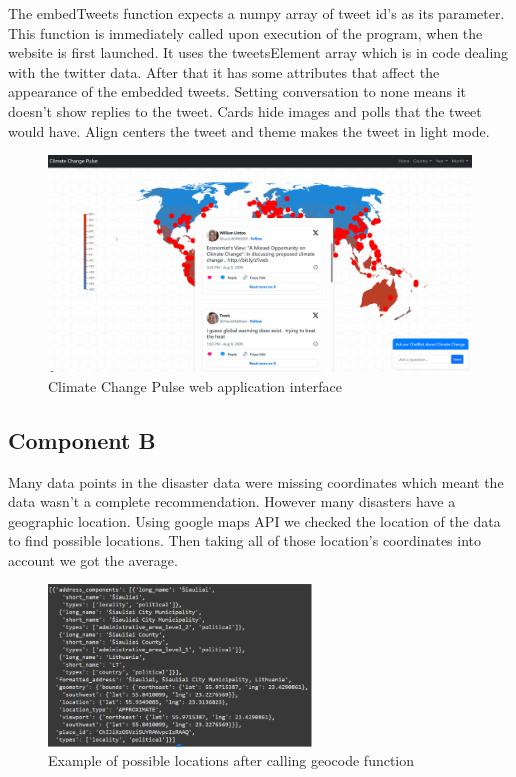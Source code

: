 \documentclass[pdflatex,sn-mathphys-num]{sn-jnl}%
\theoremstyle{thmstyleone}%
\theoremstyle{thmstyletwo}%
\theoremstyle{thmstylethree}%
\begin{document}
The embedTweets function expects a numpy array of tweet id’s as its parameter. This function is immediately called upon execution of the program, when the website is first launched. It uses the tweetsElement array which is in code dealing with the twitter data. After that it has some attributes that affect the appearance of the embedded tweets. Setting conversation to none means it doesn’t show replies to the tweet. Cards hide images and polls that the tweet would have. Align centers the tweet and theme makes the tweet in light mode.

\begin{figure}[h]
\centering
\includegraphics[width=12cm]{images/climatechangepulse3.PNG}
\caption{Climate Change Pulse web application interface}
\end{figure}

\subsection{Component B}\label{subsec8}
Many data points in the disaster data were missing coordinates which meant the data wasn’t a complete recommendation. However many disasters have a geographic location. Using google maps API we checked the location of the data to find possible locations. Then taking all of those location’s coordinates into account we got the average.

\begin{figure}
\centering
\includegraphics[width=7cm]{images/climatechangepulse4.PNG}
\caption{Example of possible locations after calling geocode function}
\end{figure}
\end{document}

